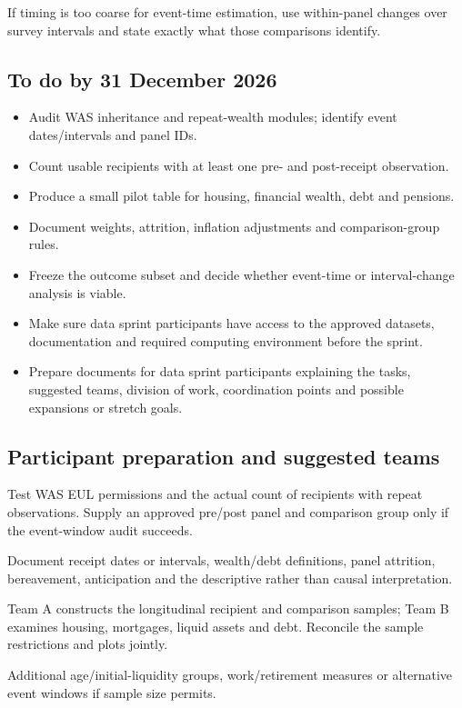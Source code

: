 If timing is too coarse for event-time estimation, use within-panel changes over survey intervals and state exactly what those comparisons identify.

\subsection{To do by 31 December 2026}
\begin{itemize}[nosep]
\item Audit WAS inheritance and repeat-wealth modules; identify event dates/intervals and panel IDs.
\item Count usable recipients with at least one pre- and post-receipt observation.
\item Produce a small pilot table for housing, financial wealth, debt and pensions.
\item Document weights, attrition, inflation adjustments and comparison-group rules.
\item Freeze the outcome subset and decide whether event-time or interval-change analysis is viable.
\item Make sure data sprint participants have access to the approved datasets, documentation and required computing environment before the sprint.
\item Prepare documents for data sprint participants explaining the tasks, suggested teams, division of work, coordination points and possible expansions or stretch goals.
\end{itemize}

\subsection{Participant preparation and suggested teams}
\begin{description}[style=nextline]
\item[Access preflight] Test WAS EUL permissions and the actual count of recipients with repeat observations. Supply an approved pre/post panel and comparison group only if the event-window audit succeeds.
\item[Participant brief] Document receipt dates or intervals, wealth/debt definitions, panel attrition, bereavement, anticipation and the descriptive rather than causal interpretation.
\item[Suggested teams] Team A constructs the longitudinal recipient and comparison samples; Team B examines housing, mortgages, liquid assets and debt. Reconcile the sample restrictions and plots jointly.
\item[Stretch goals] Additional age/initial-liquidity groups, work/retirement measures or alternative event windows if sample size permits.
\end{description}

